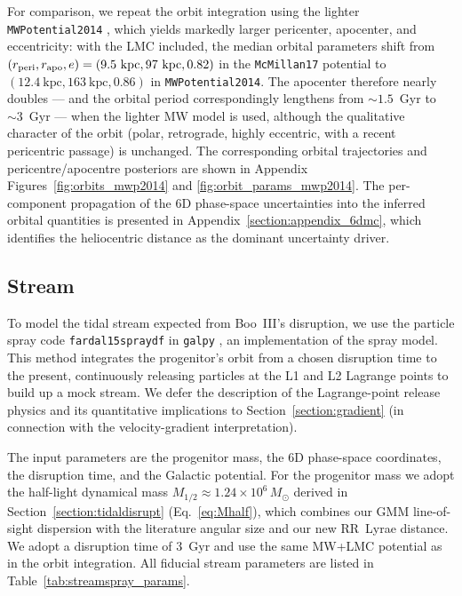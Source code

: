 \documentclass[twocolumn]{aastex631}
\begin{document}
For comparison, we repeat the orbit integration using the lighter \texttt{MWPotential2014} \citep{Bovy2015}, which yields markedly larger pericenter, apocenter, and eccentricity: with the LMC included, the median orbital parameters shift from $(r_{\rm peri}, r_{\rm apo}, e) = (9.5~\mathrm{kpc}, 97~\mathrm{kpc}, 0.82)$ in the \texttt{McMillan17} potential to $(12.4~\mathrm{kpc}, 163~\mathrm{kpc}, 0.86)$ in \texttt{MWPotential2014}. The apocenter therefore nearly doubles --- and the orbital period correspondingly lengthens from $\sim 1.5$~Gyr to $\sim 3$~Gyr --- when the lighter MW model is used, although the qualitative character of the orbit (polar, retrograde, highly eccentric, with a recent pericentric passage) is unchanged. The corresponding orbital trajectories and pericentre/apocentre posteriors are shown in Appendix Figures~\ref{fig:orbits_mwp2014} and \ref{fig:orbit_params_mwp2014}. The per-component propagation of the 6D phase-space uncertainties into the inferred orbital quantities is presented in Appendix~\ref{section:appendix_6dmc}, which identifies the heliocentric distance as the dominant uncertainty driver.


\subsection{Stream}\label{section:stream}
To model the tidal stream expected from Boo~III's disruption, we use the particle spray code \texttt{fardal15spraydf} in \texttt{galpy} \citep{Bovy2015}, an implementation of the \citet{Fardal2015} spray model.  This method integrates the progenitor's orbit from a chosen disruption time to the present, continuously releasing particles at the L1 and L2 Lagrange points to build up a mock stream.  We defer the description of the Lagrange-point release physics and its quantitative implications to Section~\ref{section:gradient} (in connection with the velocity-gradient interpretation).

The input parameters are the progenitor mass, the 6D phase-space coordinates, the disruption time, and the Galactic potential. For the progenitor mass we adopt the \citet{Wolf2010} half-light dynamical mass $M_{1/2} \approx 1.24 \times 10^{6}\,M_\odot$ derived in Section~\ref{section:tidaldisrupt} (Eq.~\ref{eq:Mhalf}), which combines our GMM line-of-sight dispersion with the literature angular size and our new RR~Lyrae distance.  We adopt a disruption time of 3~Gyr and use the same MW+LMC potential as in the orbit integration. All fiducial stream parameters are listed in Table~\ref{tab:streamspray_params}.
\end{document}
